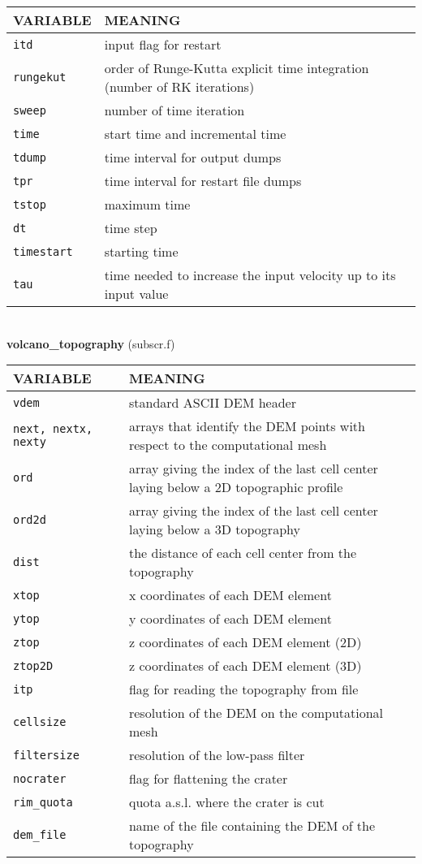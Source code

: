 \begin{tabular}{|p{6cm}|p{6cm}|}\hline
VARIABLE & MEANING\\\hline
\tt itd & input flag for restart \\\hline
\tt rungekut & order of Runge-Kutta explicit time integration (number of RK iterations) \\\hline
\tt sweep & number of time iteration \\\hline
\tt time & start time and incremental time\\\hline
\tt tdump & time interval for output dumps \\\hline
\tt tpr & time interval for restart file dumps \\\hline
\tt tstop & maximum time \\\hline 
\tt dt & time step \\\hline
\tt timestart & starting time \\\hline
\tt tau & time needed to increase the input velocity up to its input value \\\hline
\end{tabular}\\[5mm]
%
%
{\large{\bf volcano\_topography}} (subscr.f)\\[5mm]
\begin{tabular}{|p{6cm}|p{6cm}|}\hline
VARIABLE & MEANING \\ \hline
\tt vdem & standard ASCII DEM header\\\hline
\tt next, nextx, nexty & arrays that identify the DEM points with respect to the computational mesh\\\hline
\tt ord & array giving the index of the last cell center laying below a 2D topographic profile\\\hline
\tt ord2d & array giving the index of the last cell center laying below a 3D topography\\\hline
\tt dist & the distance of each cell center from the topography\\\hline
\tt xtop & x coordinates of each DEM element \\\hline
\tt ytop & y coordinates of each DEM element \\\hline
\tt ztop & z coordinates of each DEM element (2D) \\\hline
\tt ztop2D & z coordinates of each DEM element (3D) \\\hline
\tt itp & flag for reading the topography from file\\\hline
\tt cellsize & resolution of the DEM on the computational mesh\\\hline
\tt filtersize & resolution of the low-pass filter\\\hline
\tt nocrater & flag for flattening the crater\\\hline
\tt rim\_quota & quota a.s.l. where the crater is cut\\\hline
\tt dem\_file & name of the file containing the DEM of the topography\\\hline
\end{tabular}

